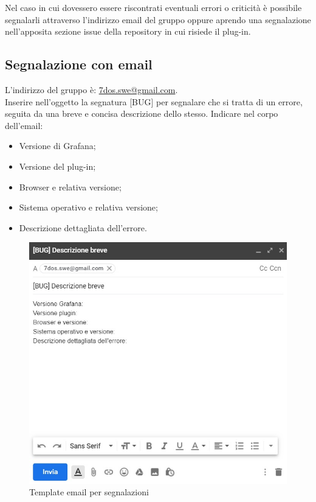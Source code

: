 \pagebreak
{}
Nel caso in cui dovessero essere riscontrati eventuali errori o criticità è possibile segnalarli attraverso l'indirizzo email del gruppo oppure aprendo una segnalazione nell'apposita sezione issue della repository in cui risiede il plug-in.

\subsection{Segnalazione con email}
L'indirizzo del gruppo è: {\url{7dos.swe@gmail.com}}. \\
Inserire nell'oggetto la segnatura [BUG] per segnalare che si tratta di un errore, seguita da una breve e concisa descrizione dello stesso.
Indicare nel corpo dell'email:
\begin{itemize}
	\item Versione di Grafana;
	\item Versione del plug-in;
	\item Browser e relativa versione;
	\item Sistema operativo e relativa versione;
	\item Descrizione dettagliata dell'errore.
\end{itemize}

\begin{figure} [H]
	\centering
	\includegraphics[scale=0.9]{Img/email.jpg} 
	\caption{Template email per segnalazioni} \label{} 
\end{figure} 

